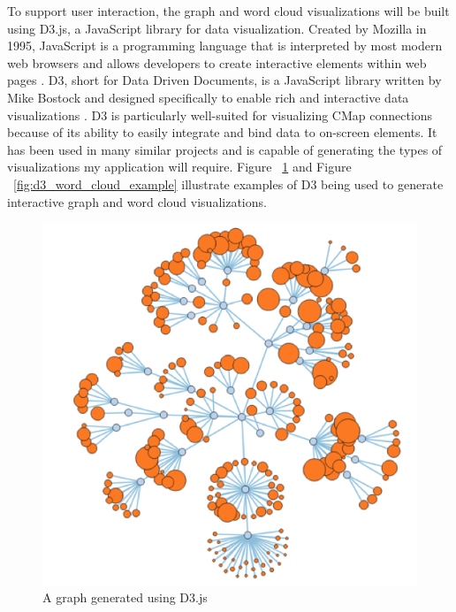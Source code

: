 \documentclass[12pt]{article}
\begin{document}
To support user interaction, the graph and word cloud visualizations will be built using D3.js, a JavaScript library for data visualization. Created by Mozilla in 1995, JavaScript is a programming language that is interpreted by most modern web browsers and allows developers to create interactive elements within web pages \cite{mozilla_javascript}. D3, short for Data Driven Documents, is a JavaScript library written by Mike Bostock and designed specifically to enable rich and interactive data visualizations \cite{bostock_d3}. D3 is particularly well-suited for visualizing CMap connections because of its ability to easily integrate and bind data to on-screen elements. It has been used in many similar projects and is capable of generating the types of visualizations my application will require. Figure ~\ref{fig:d3_graph_example} and Figure ~\ref{fig:d3_word_cloud_example} illustrate examples of D3 being used to generate interactive graph and word cloud visualizations.

\begin{figure}[h]
\centering
\includegraphics[scale=0.5]{img/d3_graph_example.png}
\caption{A graph generated using D3.js}
\label{fig:d3_graph_example}
\end{figure}
\end{document}
